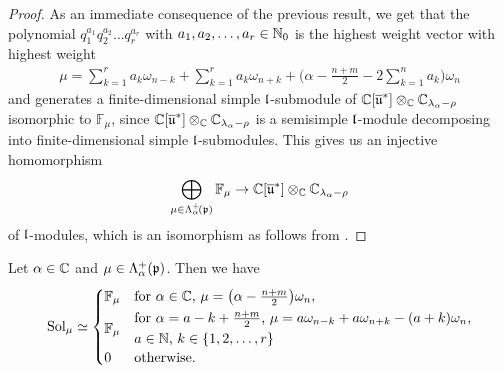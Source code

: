 \begin{proof}
As an immediate consequence of the previous result, we get that the polynomial $q_1^{a_1}q_2^{a_2}\dots q_r^{a_r}$ with $a_1,a_2,\dots,a_r \in \mathbb{N}_0$ is the highest weight vector with highest weight
\begin{align*}
\mu=\sum_{k=1}^r a_k \omega_{n-k} + \sum_{k=1}^r a_k \omega_{n+k} + \bigg(\alpha - \frac{n+m}{2} - 2\sum_{k=1}^n a_k\bigg) \omega_n
\end{align*}
and generates a finite-dimensional simple $\mathfrak{l}$-submodule of $\mathbb{C}[\overline{\mathfrak{u}}^*] \otimes_{\mathbb{C}} \mathbb{C}_{\lambda_\alpha-\rho}$ isomorphic to $\mathbb{F}_\mu$, since $\mathbb{C}[\overline{\mathfrak{u}}^*] \otimes_{\mathbb{C}} \mathbb{C}_{\lambda_\alpha-\rho}$ is a semisimple $\mathfrak{l}$-module decomposing into finite-dimensional simple $\mathfrak{l}$-submodules. This gives us an injective homomorphism
\begin{align*}
  \bigoplus_{\mu \in \Lambda^+_\alpha\!(\mathfrak{p})} \mathbb{F}_\mu \rightarrow \mathbb{C}[\overline{\mathfrak{u}}^*] \otimes_{\mathbb{C}} \mathbb{C}_{\lambda_\alpha-\rho}
\end{align*}
of $\mathfrak{l}$-modules, which is an isomorphism as follows from \cite{goodman_symmetry_2009}.
\end{proof}

\begin{lemma}\label{lem:solution space AGS}
Let $\alpha \in \mathbb{C}$ and $\mu \in \Lambda^+_\alpha(\mathfrak{p})$. Then we have
\begin{align*}
 \Sol_\mu \simeq
 \begin{cases}
   \mathbb{F}_\mu & \text{for $\alpha \in \C$, $\mu = \big(\alpha-\frac{n+m}{2}\big)\omega_n$}, \\[1mm]
   \mathbb{F}_\mu & \text{$\!\begin{gathered}\text{for $\alpha = a-k+{\textstyle \frac{n+m}{2}}$, $\mu=a \omega_{n-k} + a\omega_{n+k}-(a+k)\omega_n$,}\\[1mm] \text{$a \in \N$, $k \in \{1,2,\dots,r\}$} \hfill \end{gathered}$} \\[1mm]
   0 & \text{otherwise}.
 \end{cases}
\end{align*}
\end{lemma}


